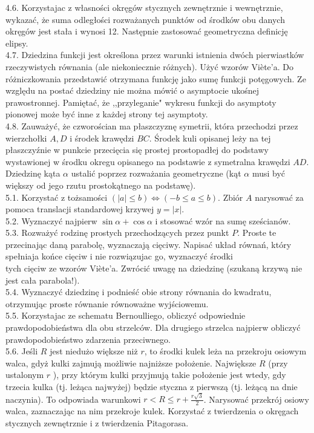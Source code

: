 \documentclass[10pt]{article}
\begin{document}
4.6. Korzystajac z własności okręgów stycznych zewnętrznie i wewnętrznie, wykazać, że suma odległości rozważanych punktów od środków obu danych okręgów jest stała i wynosi 12. Następnie zastosować geometryczna definicję elipsy.\\
4.7. Dziedzina funkcji jest określona przez warunki istnienia dwóch pierwiastków rzeczywistych równania (ale niekoniecznie różnych). Użyć wzorów Viète'a. Do różniczkowania przedstawić otrzymana funkcję jako sumę funkcji potęgowych. Ze względu na postać dziedziny nie można mówić o asymptocie ukośnej prawostronnej. Pamiętać, że ,,przyleganie" wykresu funkcji do asymptoty pionowej może być inne z każdej strony tej asymptoty.\\
4.8. Zauważyć, że czworościan ma płaszczyznę symetrii, która przechodzi przez wierzchołki $A, D$ i środek krawędzi $B C$. Środek kuli opisanej leży na tej płaszczyźnie w punkcie przecięcia się prostej prostopadłej do podstawy wystawionej w środku okregu opisanego na podstawie z symetralna krawędzi $A D$. Dziedzinę kąta $\alpha$ ustalić poprzez rozważania geometryczne (kąt $\alpha$ musi być większy od jego rzutu prostokątnego na podstawę).\\
5.1. Korzystać z tożsamości $(|a| \leq b) \Leftrightarrow(-b \leq a \leq b)$. Zbiór $A$ narysować za pomoca translacji standardowej krzywej $y=|x|$.\\
5.2. Wyznaczyć najpierw $\sin \alpha+\cos \alpha$ i stosować wzór na sumę sześcianów.\\
5.3. Rozważyć rodzinę prostych przechodzących przez punkt $P$. Proste te przecinając daną parabolę, wyznaczają cięciwy. Napisać układ równań, który spełniaja końce cięciw i nie rozwiązujac go, wyznaczyć środki\\
tych cięciw ze wzorów Viète'a. Zwrócić uwagę na dziedzinę (szukaną krzywą nie jest cała parabola!).\\
5.4. Wyznaczyć dziedzinę i podnieść obie strony równania do kwadratu, otrzymując proste równanie równoważne wyjściowemu.\\
5.5. Korzystajac ze schematu Bernoulliego, obliczyć odpowiednie prawdopodobieństwa dla obu strzelców. Dla drugiego strzelca najpierw obliczyć prawdopodobieństwo zdarzenia przeciwnego.\\
5.6. Jeśli $R$ jest niedużo większe niż $r$, to środki kulek leża na przekroju osiowym walca, gdyż kulki zajmują możliwie najniższe położenie. Największe $R$ (przy ustalonym $r$ ), przy którym kulki przyjmują takie położenie jest wtedy, gdy trzecia kulka (tj. leżąca najwyżej) będzie styczna z pierwszą (tj. leżącą na dnie naczynia). To odpowiada warunkowi $r<R \leq r+\frac{r \sqrt{3}}{2}$. Narysować przekrój osiowy walca, zaznaczając na nim przekroje kulek. Korzystać z twierdzenia o okręgach stycznych zewnętrznie i z twierdzenia Pitagorasa.\\
\end{document}
